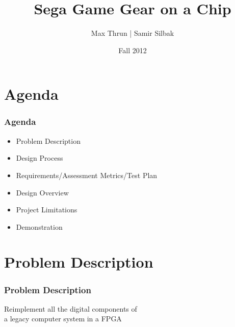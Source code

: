 \documentclass[xcolor=table]{beamer}
\title{Sega Game Gear on a Chip}
\author{Max Thrun | Samir Silbak}
\institute{University of Cincinnati}
\date{Fall 2012}
\newlength{\wideitemsep}
\let\olditem\item
\renewcommand{\item}{\setlength{\itemsep}{\wideitemsep}\olditem}
\begin{document}
\maketitle

%
%

\section{Agenda}
\begin{frame}
\frametitle{Agenda}
    \begin{itemize}
        \item Problem Description
        \item Design Process
        \item Requirements/Assessment Metrics/Test Plan
        \item Design Overview
        \item Project Limitations
        \item Demonstration
    \end{itemize}
\end{frame}

\section{Problem Description}
\begin{frame}
    \frametitle{Problem Description}
    \begin{center}
        \Large
        Reimplement all the digital components of \\a legacy computer system in a FPGA
    \end{center}
\end{frame}
\end{document}
